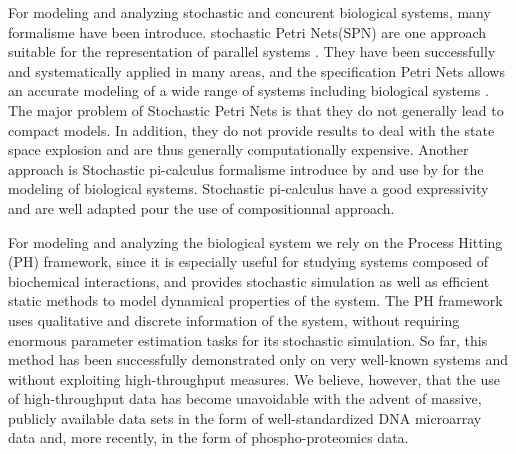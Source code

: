 


For modeling and analyzing stochastic and concurent biological systems, many formalisme have been introduce. 
stochastic Petri Nets(SPN) are one approach suitable for the representation of parallel systems \cite{molloy1982performance}. 
They have been successfully and systematically applied in many areas, and the specification Petri Nets
allows an accurate modeling of a wide range of systems including biological systems \cite{heiner2008petri}. The major 
problem of Stochastic Petri Nets is that they do not generally lead to compact models. In addition,
they do not provide results to deal with the state space explosion and are thus generally computationally
expensive. Another approach is Stochastic pi-calculus formalisme introduce by \cite{priami1995stochastic} and use by 
\cite{maurin2009modeling} for the modeling of biological systems. Stochastic pi-calculus have a good
expressivity and are well adapted pour the use of compositionnal approach.


For modeling and analyzing the biological system we rely on the Process Hitting (PH) framework\cite{PMR10-TCSB}, 
since it is especially useful for studying systems composed of biochemical interactions, and provides
stochastic simulation as well as efficient static methods to model dynamical properties of the system.
The PH framework uses qualitative and discrete information of the system, without requiring enormous parameter estimation tasks
 for its stochastic simulation. 
So far, this method has been successfully demonstrated only on very well-known systems and without exploiting 
high-throughput measures. We believe, however, that the use of high-throughput data has become unavoidable with 
the advent of massive, publicly available data sets in the form of well-standardized DNA microarray data and, 
more recently, in the form of phospho-proteomics data.  




